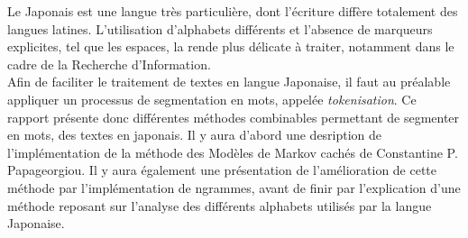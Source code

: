 
Le Japonais est une langue très particulière, dont l'écriture diffère totalement des langues latines. L'utilisation d'alphabets différents et l'absence de marqueurs explicites, tel que les espaces, la rende plus délicate à traiter, notamment dans le cadre de la Recherche d'Information.\\

Afin de faciliter le traitement de textes en langue Japonaise, il faut au préalable appliquer un processus de segmentation en mots, appelée \textit{tokenisation}. Ce rapport présente donc différentes méthodes combinables permettant de segmenter en mots, des textes en japonais. Il y aura d'abord une desription de l'implémentation de la méthode des Modèles de Markov cachés de Constantine P. Papageorgiou\cite{Papageorgiou:001}. Il y aura également une présentation de l'amélioration de cette méthode par l'implémentation de ngrammes, avant de finir par l'explication d'une méthode reposant sur l'analyse des différents alphabets utilisés par la langue Japonaise.\\
